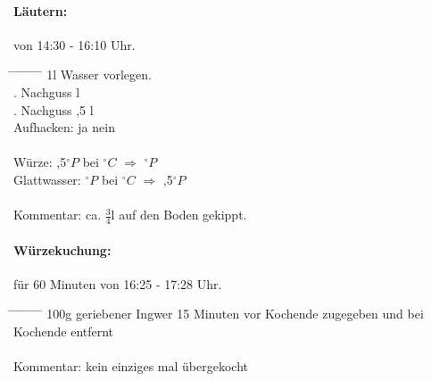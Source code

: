 \documentclass[12pt,oneside,a4paper]{scrartcl}
\begin{document}
\paragraph{Läutern:} von 14:30 - 16:10 Uhr.
	\begin{tabbing}
		\hspace{1cm} \= \hspace{1cm} \= \hspace{1cm} \= \hspace{1cm} \= \hspace{1cm} \=\hspace{1cm} \=\hspace{1cm} \=\hspace{1cm} \= \kill
		\> 1l Wasser vorlegen.\\
		\> . Nachguss \> \> 3 l\\
		\> . Nachguss \> ,5 l\\
		\> \> \> Aufhacken: \> \> \CheckedBox ja \> \> \Square nein\\\\
		\> Würze: \> \> ,5$^\circ P$ \> bei $^\circ C$ \> $\Rightarrow$ $^\circ P$\\
		\> Glattwasser: \> \> $^\circ P$ \> bei $^\circ C$ \> $\Rightarrow$ ,5$^\circ P$\\\\
		\> Kommentar: \> \> \> ca. $\frac{3}{4}$l auf den Boden gekippt.
	\end{tabbing}
%
\paragraph{Würzekuchung:} für 60 Minuten von 16:25 - 17:28 Uhr.
	\begin{tabbing}
		\hspace{1cm} \= \hspace{1cm} \= \hspace{1cm} \= \hspace{1cm} \= \hspace{1cm} \= \hspace{1cm} \= \hspace{1cm} \= \hspace{1cm} \= \kill
		\> 100g geriebener Ingwer 15 Minuten vor Kochende zugegeben und bei Kochende entfernt\\\\
		\> Kommentar: \> \> \> kein einziges mal übergekocht
	\end{tabbing}
%
\end{document}
